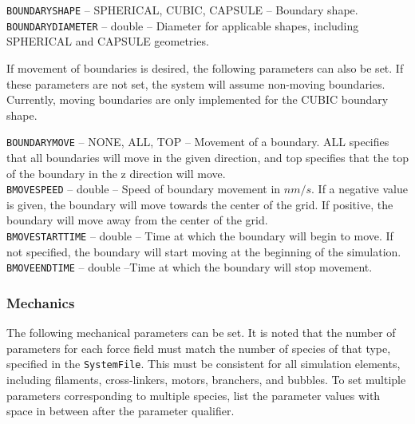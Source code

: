 \documentclass[11pt, oneside]{article}   	%
\begin{document}
\noindent \texttt{BOUNDARYSHAPE} -- SPHERICAL, CUBIC, CAPSULE -- Boundary shape. \\

\noindent \texttt{BOUNDARYDIAMETER} -- double -- Diameter for applicable shapes, including SPHERICAL and CAPSULE geometries.\\

\normalsize

\noindent If movement of boundaries is desired, the following parameters can also be set. If these parameters are not set, the system will assume non-moving boundaries. Currently, moving boundaries are only implemented for the CUBIC boundary shape. \\ 

\small 

\noindent \texttt{BOUNDARYMOVE} -- NONE, ALL, TOP -- Movement of a boundary. ALL specifies that all boundaries will move in the given direction, and top specifies that the top of the boundary in the z direction will move. \\
 
\noindent  \texttt{BMOVESPEED} -- double -- Speed of boundary movement in $nm / s$. If a negative value is given, the boundary will move towards the center of the grid. If positive, the boundary will move away from the center of the grid.\\
 
\noindent  \texttt{BMOVESTARTTIME} -- double -- Time at which the boundary will begin to move. If not specified, the boundary will start moving at the beginning of the simulation.\\
 
\noindent  \texttt{BMOVEENDTIME} -- double --Time at which the boundary will stop movement.\\ 

\normalsize
 

\subsubsection{Mechanics}

The following mechanical parameters can be set. It is noted that the number of parameters for each force field must match the number of species of that type, specified in the \texttt{SystemFile}. This must be consistent for all simulation elements, including filaments, cross-linkers, motors, branchers, and bubbles. To set multiple parameters corresponding to multiple species, list the parameter values with space in between after the parameter qualifier. \\
\end{document}
